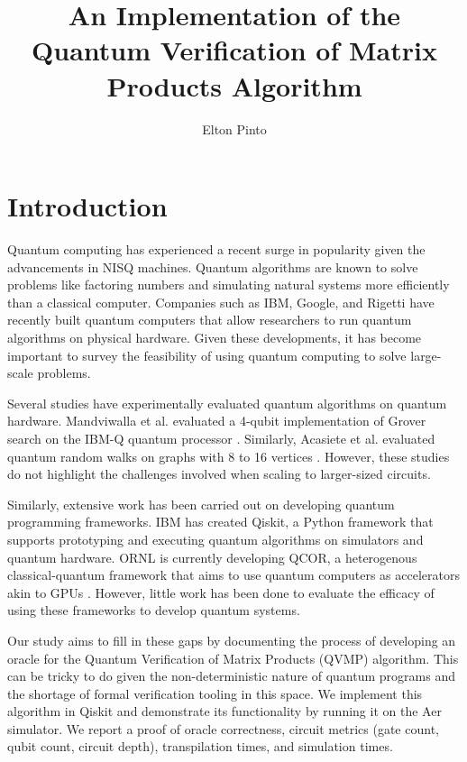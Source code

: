 \documentclass[11pt]{article}
\title{An Implementation of the Quantum Verification of Matrix Products Algorithm}
\author{Elton Pinto}
\date{}
\theoremstyle{definition}
\theoremstyle{remark}
\begin{document}
\maketitle

\section{Introduction}

Quantum computing has experienced a recent surge in popularity given the
advancements in NISQ machines. Quantum algorithms are known to solve problems
like factoring numbers and simulating natural systems more efficiently than a
classical computer. Companies such as IBM, Google, and Rigetti have recently
built quantum computers that allow researchers to run quantum algorithms on
physical hardware. Given these developments, it has become important to survey
the feasibility of using quantum computing to solve large-scale problems.

Several studies have experimentally evaluated quantum algorithms on quantum
hardware. Mandviwalla et al. evaluated a 4-qubit implementation of Grover
search on the IBM-Q quantum processor \cite{mandviwalla2018implementing}.
Similarly, Acasiete et al. evaluated quantum random walks on graphs with 8 to
16 vertices \cite{acasiete2020implementation}. However, these studies do not
highlight the challenges involved when scaling to larger-sized circuits.

Similarly, extensive work has been carried out on developing quantum
programming frameworks. IBM has created Qiskit, a Python framework that
supports prototyping and executing quantum algorithms on simulators and quantum
hardware. ORNL is currently developing QCOR, a heterogenous classical-quantum
framework that aims to use quantum computers as accelerators akin to GPUs
\cite{mintz2020qcor}. However, little work has been done to evaluate the
efficacy of using these frameworks to develop quantum systems.

Our study aims to fill in these gaps by documenting the process of developing an
oracle for the Quantum Verification of Matrix Products (QVMP)
\cite{buhrman2005quantum}\cite{ambainis2002quantummatrix} algorithm. This can be
tricky to do given the non-deterministic nature of quantum programs and the
shortage of formal verification tooling in this space. We implement this
algorithm in Qiskit and demonstrate its functionality by running it on the Aer
simulator. We report a proof of oracle correctness, circuit metrics (gate count,
qubit count, circuit depth), transpilation times, and simulation times.
\end{document}
